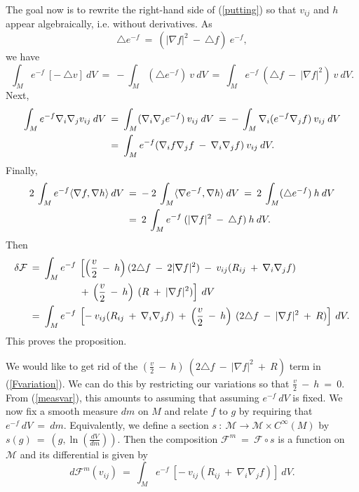The goal now is to rewrite the right-hand side of
(\ref{putting}) so that $v_{ij}$ and $h$ appear
algebraically, i.e. without derivatives.
As
\begin{equation} \label{id}
\triangle e^{-f} \: = \: (|\nabla f|^2 \: - \: \triangle f) \: e^{-f},
\end{equation}
we have
\begin{equation}
\int_M e^{-f} \: [ - \: \triangle v ] \: dV \: = \:
- \int_M (\triangle e^{-f} )\: v \: dV \: = \:
\int_M e^{-f} \: (\triangle f \: - \: |\nabla f|^2 ) \: v \: dV.
\end{equation}
Next,
\begin{align}
\int_M e^{-f} \nabla_i \nabla_j v_{ij} \: dV \: & = \:
\int_M (\nabla_i \nabla_j e^{-f}) \: v_{ij} \: dV \: = \:
- \: \int_M \nabla_i ( e^{-f} \nabla_j f) \: v_{ij} \: dV \\
& = \:
\int_M e^{-f} (\nabla_i f \nabla_j f \: - \: \nabla_i \nabla_j f)
\: v_{ij} \: dV. \notag
\end{align}
Finally,
\begin{align}
2 \: \int_M e^{-f} \langle \nabla f, \nabla h \rangle \: dV \: & = \:
- \: 2 \: \int_M  \langle \nabla e^{-f}, \nabla h \rangle \: dV \: = \:
2 \: \int_M  (\triangle e^{-f}) \: h \: dV \\
& = \:
2 \: \int_M e^{-f} \:
(|\nabla f|^2 \: - \: \triangle f) \: h \: dV. \notag
\end{align}
Then
\begin{align} \label{Fvariation}
\delta {\mathcal F} \: = \:
\int_M e^{-f} \: & \left[
\left( \frac{v}{2} \: - \: h \right) (2 \triangle f \: - \:
2 |\nabla f|^2 ) \: - \: v_{ij} (R_{ij} \: + \: \nabla_i \nabla_j f)
\right. \\
&
\left.  + \: \left( \frac{v}{2} \: - \: h \right) \:
(R \: + \: |\nabla f|^2 )
\right] \: dV \notag \\
=  \: \int_M e^{-f} \: & \left[ - \: v_{ij}
(R_{ij} \: + \: \nabla_i \nabla_j f) \: + \:
\left( \frac{v}{2} \: - \: h \right) \: (2 \triangle f \: - \:
|\nabla f|^2 \: + \: R) \right] \: dV. \notag
\end{align}
This proves the proposition.
\endgroup\par\medskip

We would like to get rid of the $\left( \frac{v}{2} \: - \: h \right) \: (2 \triangle f \: - \:
|\nabla f|^2 \: + \: R)$ term in (\ref{Fvariation}).  We can do this by restricting
our variations so that $\frac{v}{2} \: - \: h \: = \: 0$. From
(\ref{measvar}), this amounts to assuming that assuming $e^{-f} \: dV$ is fixed.
We now fix a smooth measure $dm$ on $M$ and relate $f$ to $g$ by
requiring that $e^{-f} \: dV \: = \: dm$. Equivalently, we define
a section $s \: : \: {\mathcal M} \rightarrow {\mathcal M} \times C^\infty(M)$
by $s(g) \: = \: \left( g, \ln \left( \frac{dV}{dm}\right) \right)$.
Then the composition ${\mathcal F}^m \: = \:
{\mathcal F}\circ s$ is a function on ${\mathcal M}$ and its differential
is given by
\begin{equation}
d{\mathcal F}^m (v_{ij}) \: = \: \int_M e^{-f} \: \left[ - \: v_{ij}
(R_{ij} \: + \: \nabla_i \nabla_j f) \right] \: dV.
\end{equation}

